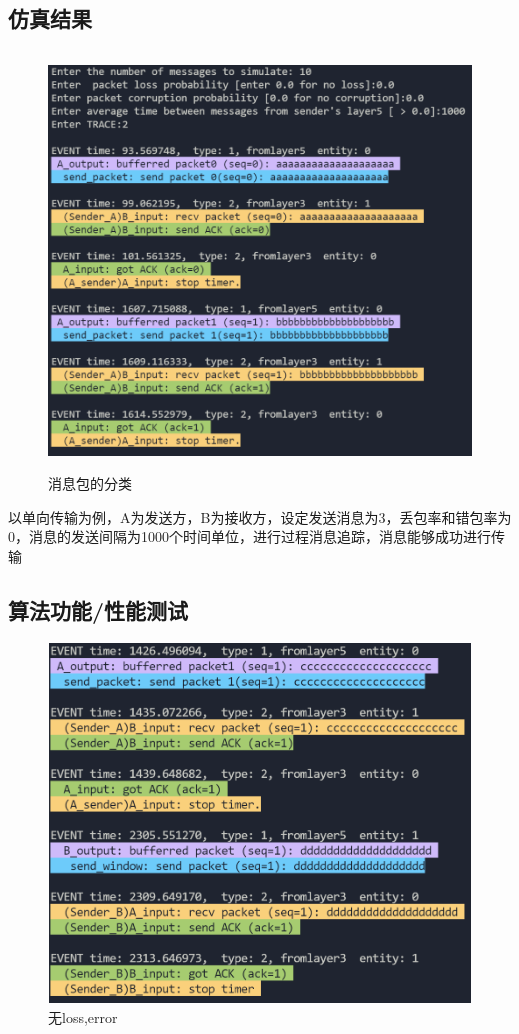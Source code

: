 \documentclass[UTF8,14pt]{article}
\numberwithin{figure}{section}
\begin{document}
\subsection{仿真结果}
\vspace{-0.7cm}
\begin{figure}[!htbp]
      \centering
      \setlength{\abovecaptionskip}{0.cm}
      \includegraphics[width=12cm,height=11.07cm]{figures/gbn.png}
      \caption{消息包的分类}
\end{figure}
以单向传输为例，A为发送方，B为接收方，设定发送消息为3，丢包率和错包率为0，消息的发送间隔为1000个时间单位，进行过程消息追踪，消息能够成功进行传输
\vspace{-0.5cm}
\subsection{算法功能/性能测试}
\vspace{-0.5cm}
\begin{figure}[!htbp]
      \centering
      \setlength{\abovecaptionskip}{0.cm}
      \includegraphics[width=12cm,height=9.54cm]{figures/gbn0_1.png}
      \caption{无loss,error}
\end{figure}
\end{document}
